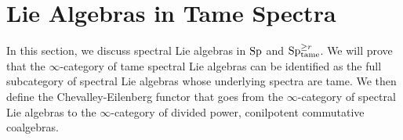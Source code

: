 %
%
%
%


\section{Lie Algebras in Tame Spectra}
\label{Lie Algebras in Tame Spectra}
In this section, we discuss spectral Lie algebras in $\operatorname{Sp}$ and $\operatorname{Sp}^{\geq r}_{\operatorname{tame}}$. We will prove that the $\infty$-category of tame spectral Lie algebras can be identified as the full subcategory of spectral Lie algebras whose underlying spectra are tame.
We then define the Chevalley-Eilenberg functor that goes from the $\infty$-category of spectral Lie algebras to the $\infty$-category of divided power, conilpotent commutative coalgebras.



